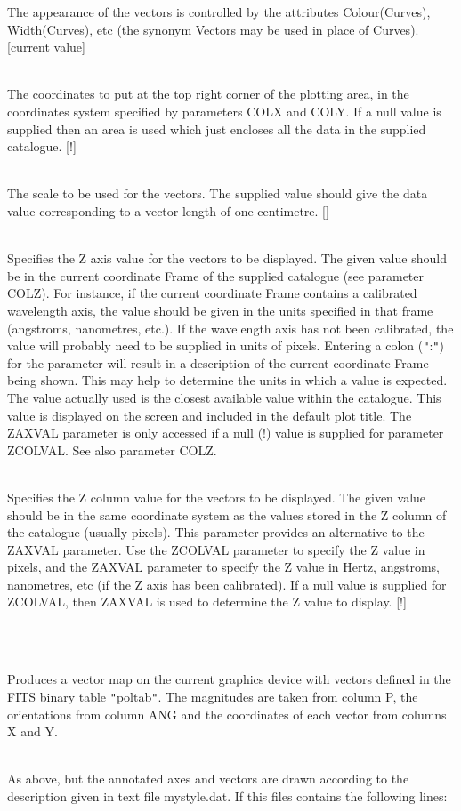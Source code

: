 \documentclass[twoside,11pt]{article}
\renewcommand{\_}{\texttt{\symbol{95}}}
\newlength{\sstexampleslength}
\newcommand{\sstexamples}[1]{
   \item[Examples:] \mbox{} \\
   \vspace{-3.5ex}
   \begin{description}
      #1
   \end{description}
}
\newcommand{\sstsubsection}[1]{ \item[{#1}] \mbox{} \\}
\newcommand{\sstexamplesubsection}[2]{\sloppy
\item[\parbox{\sstexampleslength}{\ssttt #1}] \mbox{} \vspace{1.0ex}
\\ #2 }
\newcommand{\sstexamples}[1]{
      \item[Examples:] \\
      \begin{description}
         #1
      \end{description}
      \\
   }
\newcommand{\sstsubsection}[1]{\item[{#1}]}
\newcommand{\sstexamplesubsection}[2]{\item[{\ssttt #1}] #2}
\begin{document}
{{{         The appearance of the vectors is controlled by the attributes
         Colour(Curves), Width(Curves), etc (the synonym Vectors may be
         used in place of Curves). [current value]
      }
      \sstsubsection{
         UBND(2) = \_REAL (Read)
      }{
         The coordinates to put at the top right corner of the plotting
         area, in the coordinates system specified by parameters COLX and
         COLY. If a null value is supplied then an area is used which just
         encloses all the data in the supplied catalogue. [!]
      }
      \sstsubsection{
         VSCALE = \_REAL (Read)
      }{
         The scale to be used for the vectors.  The supplied value
         should give the data value corresponding to a vector length of
         one centimetre.  []
      }
      \sstsubsection{
         ZAXVAL = LITERAL (Read)
      }{
         Specifies the Z axis value for the vectors to be displayed. The
         given value should be in the current coordinate Frame of the
         supplied catalogue (see parameter COLZ). For instance, if the
         current coordinate Frame contains a calibrated wavelength axis,
         the value should be given in the units specified in that frame
         (angstroms, nanometres, etc.). If the wavelength axis has not been
         calibrated, the value will probably need to be supplied in units
         of pixels. Entering a colon ({\tt "}:{\tt "}) for the parameter will result in
         a description of the current coordinate Frame being shown. This may
         help to determine the units in which a value is expected. The
         value actually used is the closest available value within the
         catalogue. This value is displayed on the screen and included in
         the default plot title. The ZAXVAL parameter is only accessed if a
         null (!) value is supplied for parameter ZCOLVAL. See also
         parameter COLZ.
      }
      \sstsubsection{
         ZCOLVAL = \_REAL (Read)
      }{
         Specifies the Z column value for the vectors to be displayed.
         The given value should be in the same coordinate system as the
         values stored in the Z column of the catalogue (usually pixels).
         This parameter provides an alternative to the ZAXVAL parameter.
         Use the ZCOLVAL parameter to specify the Z value in pixels, and
         the ZAXVAL parameter to specify the Z value in Hertz, angstroms,
         nanometres, etc (if the Z axis has been calibrated). If a null
         value is supplied for ZCOLVAL, then ZAXVAL is used to determine
         the Z value to display. [!]
      }
   }
   \sstexamples{
      \sstexamplesubsection{
         polplot poltab
      }{
         Produces a vector map on the current graphics device with
         vectors defined in the FITS binary table {\tt "}poltab{\tt "}. The magnitudes
         are taken from column P, the orientations from column ANG and
         the coordinates of each vector from columns X and Y.
      }
      \sstexamplesubsection{
         polplot poltab style=$\wedge$mystyle.dat
      }{
         As above, but the annotated axes and vectors are drawn according
         to the description given in text file mystyle.dat. If this
         files contains the following lines:

}}}
\end{document}

